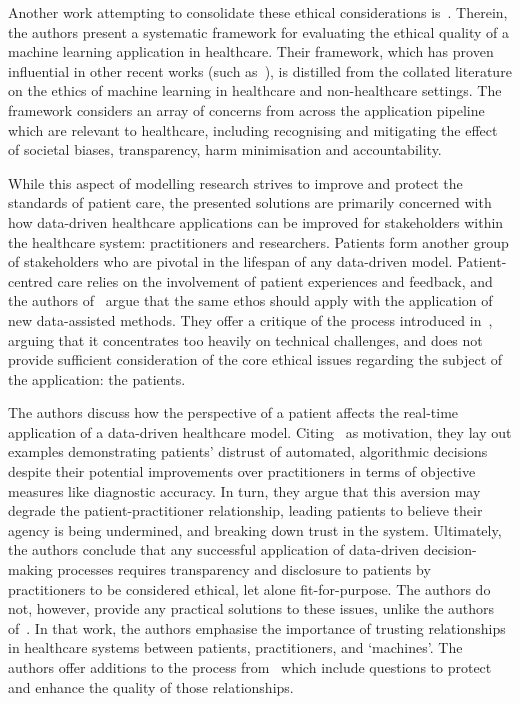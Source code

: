 Another work attempting to consolidate these ethical considerations
is~\cite{Char2020}. Therein, the authors present a systematic framework for
evaluating the ethical quality of a machine learning application in healthcare.
Their framework, which has proven influential in other recent works (such
as~\cite{Findley2020,Kraft2020}), is distilled from the collated literature on
the ethics of machine learning in healthcare and non-healthcare settings. The
framework considers an array of concerns from across the application pipeline
which are relevant to healthcare, including recognising and mitigating the
effect of societal biases, transparency, harm minimisation and accountability.

While this aspect of modelling research strives to improve and protect the
standards of patient care, the presented solutions are primarily concerned with
how data-driven healthcare applications can be improved for stakeholders within
the healthcare system: practitioners and researchers. Patients form another
group of stakeholders who are pivotal in the lifespan of any data-driven
model. Patient-centred care relies on the involvement of patient experiences and
feedback, and the authors of~\cite{Findley2020} argue that the same ethos should
apply with the application of new data-assisted methods. They offer a critique
of the process introduced in~\cite{Char2020}, arguing that it concentrates too
heavily on technical challenges, and does not provide sufficient consideration
of the core ethical issues regarding the subject of the application: the
patients.

The authors discuss how the perspective of a patient affects the real-time
application of a data-driven healthcare model. Citing~\cite{Dietvorst2015} as
motivation, they lay out examples demonstrating patients' distrust of automated,
algorithmic decisions despite their potential improvements over practitioners in
terms of objective measures like diagnostic accuracy. In turn, they argue that
this aversion may degrade the patient-practitioner relationship, leading
patients to believe their agency is being undermined, and breaking down trust in
the system. Ultimately, the authors conclude that any successful application of
data-driven decision-making processes requires transparency and disclosure to
patients by practitioners to be considered ethical, let alone fit-for-purpose.
The authors do not, however, provide any practical solutions to these issues,
unlike the authors of~\cite{Kraft2020}. In that work, the authors emphasise the
importance of trusting relationships in healthcare systems between patients,
practitioners, and `machines'. The authors offer additions to the process
from~\cite{Char2020} which include questions to protect and enhance the quality
of those relationships.

